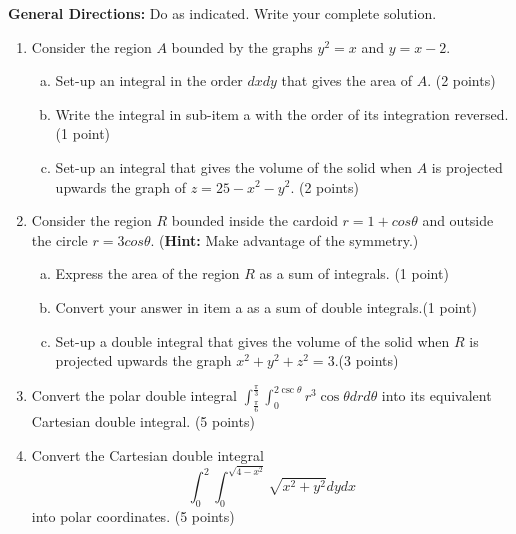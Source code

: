 \documentclass{article}
\begin{document}
\noindent \textbf{General Directions:} Do as indicated. Write your complete solution.
\begin{enumerate}[1.]
    \item{Consider the region $A$ bounded by the graphs $y^2=x$ and $y=x-2$.}
    \vspace{-0.5em}
        \begin{enumerate}[a.]
            \item{Set-up an integral in the order $dxdy$ that gives the area of $A$.} \hfill (2 points)
            \item{Write the integral in sub-item a with the order of its integration reversed.} \hfill (1 point)
            \item{Set-up an integral that gives the volume of the solid when $A$ is projected upwards the graph of $z=25-x^2-y^2$.} \hfill (2 points)
        \end{enumerate}
    \vspace{5cm}
    
    \item{Consider the region $R$ bounded inside the cardoid $r=1+cos\theta$ and outside the circle $r=3cos\theta$. (\textbf{Hint:} Make advantage of the symmetry.)}
    \vspace{-0.5em}
        \begin{enumerate}[a.]
            \item{Express the area of the region $R$ as a sum of integrals.} \hfill (1 point)
            \item{Convert your answer in item a as a sum of double integrals.}\hfill (1 point)
            \item{Set-up a double integral that gives the volume of the solid when $R$ is projected upwards the graph $x^2+y^2+z^2=3$.}\hfill (3 points)
    \end{enumerate}
    \vspace{5cm}
    
    \item{Convert the polar double integral $\int_{\frac{\pi}{6}}^{\frac{\pi}{3}} \int_{0}^{2\csc \theta} r^3\cos \theta drd\theta$ into its equivalent Cartesian double integral.} \hfill (5 points)
    \vspace{10em}

\newpage
\thispagestyle{plain}
\vspace*{-5em}
    \item{Convert the Cartesian double integral 
    \[\int_{0}^{2} \int_{0}^{\sqrt{4-x^2}} \sqrt{x^2+y^2} dydx\]
    into polar coordinates.} \hfill (5 points)
    \vspace{10em}
    

\end{enumerate}
\end{document}
